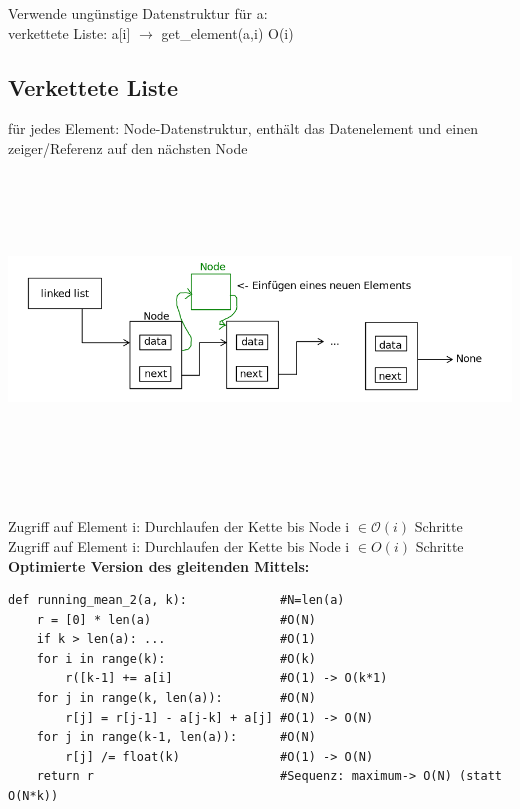 \documentclass[11pt, fleqn]{scrreprt}
\newcommand{\bigO}[0]{\mathcal{O}}
\begin{document}
Verwende ungünstige Datenstruktur für a: \\
verkettete Liste: a[i] $\rightarrow$ get\_element(a,i) \hspace*{1cm} O(i)\\

\subsection*{Verkettete Liste}
für jedes Element: Node-Datenstruktur, enthält das Datenelement und einen zeiger/Referenz auf den nächsten Node \\

\includegraphics[width=15cm,height=9cm,keepaspectratio]{./Pictures/linkedlist.png}

Zugriff auf Element i: Durchlaufen der Kette bis Node i $\in \bigO{}(i)$ Schritte \\

Zugriff auf Element i: Durchlaufen der Kette bis Node i $\in O(i)$ Schritte \\

\textbf{Optimierte Version des gleitenden Mittels:}
\begin{verbatim}
def running_mean_2(a, k):             #N=len(a)
    r = [0] * len(a)                  #O(N)
    if k > len(a): ...                #O(1)
    for i in range(k):                #O(k)
        r([k-1] += a[i]               #O(1) -> O(k*1)
    for j in range(k, len(a)):        #O(N)
        r[j] = r[j-1] - a[j-k] + a[j] #O(1) -> O(N)
    for j in range(k-1, len(a)):      #O(N)
        r[j] /= float(k)              #O(1) -> O(N)
    return r                          #Sequenz: maximum-> O(N) (statt O(N*k))
\end{verbatim}
\end{document}
